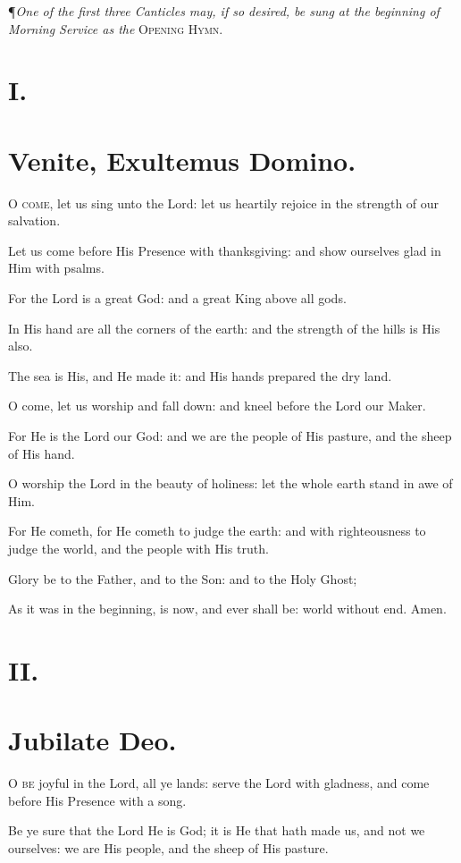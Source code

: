 \P\textit{One of the first three Canticles may, if so desired, be sung at the beginning of Morning Service as the} \textsc{Opening Hymn.}

\section*{I.}
\section*{Venite, Exultemus Domino.}

\lettrine{O}{ come,} let us sing unto the Lord: let us heartily rejoice in the strength of our salvation.

Let us come before His Presence with thanksgiving: and show ourselves glad in Him with psalms.

For the Lord is a great God: and a great King above all gods.

In His hand are all the corners of the earth: and the strength of the hills is His also.

The sea is His, and He made it: and His hands prepared the dry land.

O come, let us worship and fall down: and kneel before the Lord our Maker.

For He is the Lord our God: and we are the people of His pasture, and the sheep of His hand.

O worship the Lord in the beauty of holiness: let the whole earth stand in awe of Him.

For He cometh, for He cometh to judge the earth: and with righteousness to judge the world, and the people with His truth.

Glory be to the Father, and to the Son: and to the Holy Ghost;

As it was in the beginning, is now, and ever shall be: world without end. Amen. 

\section*{II.}
\section*{Jubilate Deo.}

\lettrine{O}{ be} joyful in the Lord, all ye lands: serve the Lord with gladness, and come before His Presence with a song. 

Be ye sure that the Lord He is God; it is He that hath made us, and not we ourselves: we are His people, and the sheep of His pasture.

